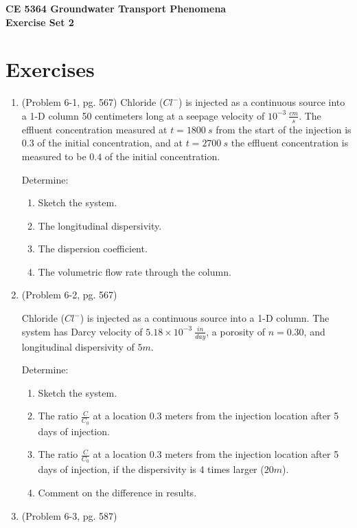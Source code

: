 \documentclass[12pt]{article}
\begin{document}
\begin{center}
{\textbf{{ CE 5364 Groundwater Transport Phenomena } \\ {Exercise Set 2}}}
\end{center}

\section*{\small{Exercises}}
\begin{enumerate}
\item (Problem 6-1, pg. 567)
Chloride ($Cl^{-}$) is injected as a continuous source into a 1-D column 50 centimeters long at a seepage velocity of $10^{-3}~\frac{cm}{s}$.  The effluent concentration measured at $t=1800~s$ from the start of the injection is $0.3$ of the initial concentration, and at $t=2700~s$ the effluent concentration is measured to be $0.4$ of the initial concentration.

Determine:
\begin{enumerate}
\item Sketch the system.
\item The longitudinal dispersivity.
\item The dispersion coefficient.
\item The volumetric flow rate through the column.
\end{enumerate}

\item (Problem 6-2, pg. 567)

Chloride ($Cl^{-}$) is injected as a continuous source into a 1-D column.
The system has Darcy velocity of $5.18 \times 10^{-3}~\frac{in}{day}$, a porosity of $n=0.30$, and longitudinal dispersivity of $5 m$.

Determine:
\begin{enumerate}
\item Sketch the system.
\item The ratio $\frac{C}{C_0}$ at a location 0.3 meters from the injection location after 5 days of injection. 
\item The ratio $\frac{C}{C_0}$ at a location 0.3 meters from the injection location after 5 days of injection, if the dispersivity is 4 times larger ($20 m$).
\item Comment on the difference in results.
\end{enumerate}

\clearpage

\item (Problem 6-3, pg. 587)


\end{enumerate}
\end{document}
